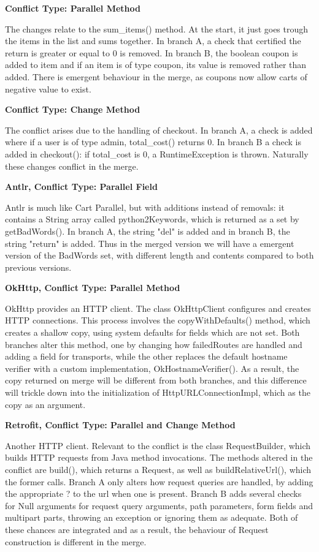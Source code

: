 \textbf{Conflict Type: Parallel Method}

The changes relate to the sum\_items() method. At the start, it just goes trough the items in the list and sums together. In branch A,
a check that certified the return is greater or equal to 0 is removed. In branch B, the boolean coupon is added to item and if an item
is of type coupon, its value is removed rather than added. There is emergent behaviour in the merge, as coupons now allow carts of negative
value to exist.

\textbf{Conflict Type: Change Method}

The conflict arises due to the handling of checkout. In branch A, a check is added where if a user is of type admin,
total\_cost() returns 0. In branch B a check is added in checkout(): if total\_cost is 0, a RuntimeException is thrown.
Naturally these changes conflict in the merge.

\textbf{Antlr, Conflict Type: Parallel Field}

Antlr is much like Cart Parallel, but with additions instead of removals: it contains a String array called python2Keywords, which is returned as a set by
getBadWords(). In branch A, the string "del" is added and in branch B, the string "return" is added. Thus in the merged version we will have a emergent version
of the BadWords set, with different length and contents compared to both previous versions.

\textbf{OkHttp, Conflict Type: Parallel Method}

OkHttp provides an HTTP client. The class OkHttpClient configures and creates HTTP connections. This process involves
the copyWithDefaults() method, which creates a shallow copy, using system defaults for fields which are not set. Both branches
alter this method, one by changing how failedRoutes are handled and adding a field for transports, while the other replaces
the default hostname verifier with a custom implementation, OkHostnameVerifier(). As a result, the copy returned on merge will
be different from both branches, and this difference will trickle down into the initialization of HttpURLConnectionImpl, which
as the copy as an argument.

\textbf{Retrofit, Conflict Type: Parallel and Change Method}

Another HTTP client. Relevant to the conflict is the class RequestBuilder, which builds HTTP requests from Java method invocations. The methods altered
in the conflict are build(), which returns a Request, as well as buildRelativeUrl(), which the former calls.
Branch A only alters how request queries are handled, by adding the appropriate ? to the url when one is present.
Branch B adds several checks for Null arguments for request query arguments, path parameters, form fields and multipart parts, throwing an exception or ignoring them
as adequate.
Both of these chances are integrated and as a result, the behaviour of Request construction is different in the merge.

